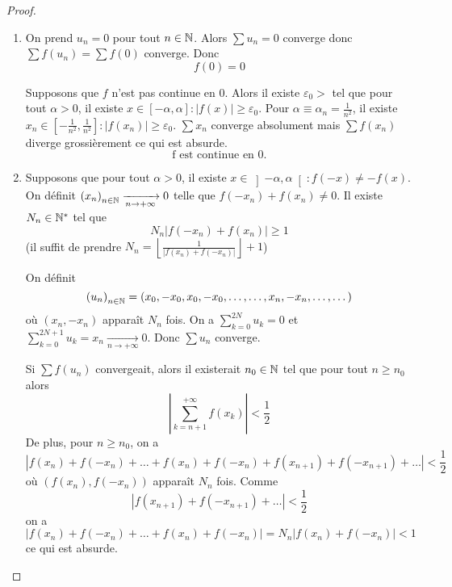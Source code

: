 \begin{proof}
	\phantom{}
	\begin{enumerate}
		\item On prend $u_{n}=0$ pour tout $n\in\mathbb{N}$. Alors $\sum u_{n}=0$ converge donc $\sum f\left(u_{n}\right)=\sum f(0)$ converge. Donc 
		$$\boxed{f(0)=0}$$

		Supposons que $f$ n'est pas continue en 0. Alors il existe $\varepsilon_{0}>$ tel que pour tout $\alpha>0$, il existe $x\in\left[-\alpha,\alpha\right]\colon\left\lvert f(x)\right\rvert\geqslant\varepsilon_{0}$. Pour $\alpha\equiv\alpha_{n}=\frac{1}{n^{2}}$, il existe $x_{n}\in\left[-\frac{1}{n^{2}},\frac{1}{n^{2}}\right]\colon\left\lvert f(x_{n})\right\rvert\geqslant\varepsilon_{0}$.
		$\sum x_{n}$ converge absolument mais $\sum f\left(x_{n}\right)$ diverge grossièrement ce qui est absurde.
		$$\boxed{\text{f est continue en 0.}}$$

		\item Supposons que pour tout $\alpha>0$, il existe $x\in\left]-\alpha,\alpha\right[\colon f\left(-x\right)\neq-f\left(x\right)$.
		On définit $\left(x_{n}\right)_{n\in\mathbb{N}}\xrightarrow[n\to+\infty]{}0$ telle que $f\left(-x_{n}\right)+f\left(x_{n}\right)\neq 0$. Il existe $N_{n}\in\mathbb{N}^{*}$ tel que 
		$$N_{n}\left\lvert f\left(-x_{n}\right)+f\left(x_{n}\right)\right\rvert\geqslant1$$
		(il suffit de prendre $N_{n}=\left\lfloor\frac{1}{\left\lvert f\left(x_{n}\right)+f\left(-x_{n}\right)\right\rvert}\right\rfloor+1$)

		On définit 
		$$\left(u_{n}\right)_{n\in\mathbb{N}}=\left(x_{0},-x_{0},x_{0},-x_{0},\dots,\dots,x_{n},-x_{n},\dots,\dots\right)$$
		où $\left(x_{n},-x_{n}\right)$ apparaît $N_{n}$ fois. On a 
		$\sum_{k=0}^{2N}u_{k}=0$ et $\sum_{k=0}^{2N+1}u_{k}=x_{n}\xrightarrow[n\to+\infty]{}0$. Donc $\sum u_{n}$ converge.

		Si $\sum f\left(u_{n}\right)$ convergeait, alors il existerait $n_{0}\in\mathbb{N}$ tel que pour tout $n\geqslant n_{0}$ alors 
		$$\left\lvert\sum_{k=n+1}^{+\infty}f\left(x_{k}\right)\right\rvert<\frac{1}{2}$$
		De plus, pour $n\geqslant n_{0}$, on a 
		$$\left\lvert f\left(x_n\right)+f\left(-x_n\right)+\dots+f\left(x_n\right)+f\left(-x_n\right)+f\left(x_{n+1}\right)+f\left(-x_{n+1}\right)+\dots\right\rvert<\frac{1}{2}$$
		où $\left(f\left(x_{n}\right),f\left(-x_{n}\right)\right)$ apparaît $N_{n}$ fois.
		Comme 
		$$\left\lvert f\left(x_{n+1}\right)+f\left(-x_{n+1}\right)+\dots\right\rvert<\frac{1}{2}$$
		on a 
		$$\left\lvert f\left(x_n\right)+f\left(-x_n\right)+\dots+f\left(x_n\right)+f\left(-x_n\right)\right\rvert=N_{n}\left\lvert f\left(x_n\right)+f\left(-x_n\right)\right\rvert<1$$
		ce qui est absurde.


\end{enumerate}
\end{proof}
